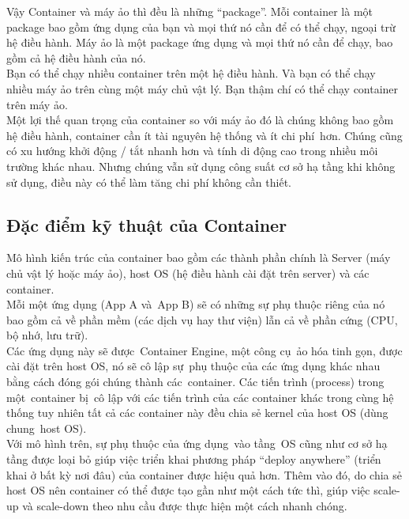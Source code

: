 \documentclass[14pt,a4paper]{book}
\begin{document}
		Vậy Container và máy ảo thì đều là những “package”. Mỗi container là một package bao gồm ứng dụng của bạn và mọi thứ nó cần để có thể chạy, ngoại trừ hệ điều hành. Máy ảo là một package ứng dụng và mọi thứ nó cần để chạy, bao gồm cả hệ điều hành của nó.\\
		
		Bạn có thể chạy nhiều container trên một hệ điều hành. Và bạn có thể chạy nhiều máy ảo trên cùng một máy chủ vật lý. Bạn thậm chí có thể chạy container trên máy ảo.\\
		
		Một lợi thế quan trọng của container so với máy ảo đó là chúng không bao gồm hệ điều hành, container cần ít tài nguyên hệ thống và ít chi phí hơn. Chúng cũng có xu hướng khởi động / tắt nhanh hơn và tính di động cao trong nhiều môi trường khác nhau. Nhưng chúng vẫn sử dụng công suất cơ sở hạ tầng khi không sử dụng, điều này có thể làm tăng chi phí không cần thiết.
		\subsection{Đặc điểm kỹ thuật của Container}
		\hspace{0.6cm}Mô hình kiến trúc của container bao gồm các thành phần chính là Server (máy chủ vật lý hoặc máy ảo), host OS (hệ điều hành cài đặt trên server) và các container.\\
		
		Mỗi một ứng dụng (App A và App B) sẽ có những sự phụ thuộc riêng của nó bao gồm cả về phần mềm (các dịch vụ hay thư viện) lẫn cả về phần cứng (CPU, bộ nhớ, lưu trữ).\\
		
		Các ứng dụng này sẽ được Container Engine, một công cụ ảo hóa tinh gọn, được cài đặt trên host OS, nó sẽ cô lập sự phụ thuộc của các ứng dụng khác nhau bằng cách đóng gói chúng thành các container. Các tiến trình (process) trong một container bị cô lập với các tiến trình của các container khác trong cùng hệ thống tuy nhiên tất cả các container này đều chia sẻ kernel của host OS (dùng chung host OS).\\
		
		Với mô hình trên, sự phụ thuộc của ứng dụng vào tầng OS cũng như cơ sở hạ tầng được loại bỏ giúp việc triển khai phương pháp “deploy anywhere” (triển khai ở bất kỳ nơi đâu) của container được hiệu quả hơn. Thêm vào đó, do chia sẻ host OS nên container có thể được tạo gần như một cách tức thì, giúp việc scale-up và scale-down theo nhu cầu được thực hiện một cách nhanh chóng.
\end{document}
